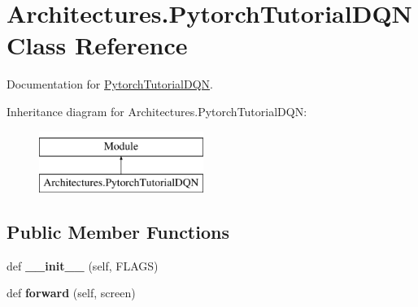 \hypertarget{classArchitectures_1_1PytorchTutorialDQN}{}\section{Architectures.\+Pytorch\+Tutorial\+D\+QN Class Reference}
\label{classArchitectures_1_1PytorchTutorialDQN}


Documentation for \mbox{\hyperlink{classArchitectures_1_1PytorchTutorialDQN}{Pytorch\+Tutorial\+D\+QN}}.  


Inheritance diagram for Architectures.\+Pytorch\+Tutorial\+D\+QN\+:\begin{figure}[H]
\begin{center}
\leavevmode
\includegraphics[height=2.000000cm]{classArchitectures_1_1PytorchTutorialDQN}
\end{center}
\end{figure}
\subsection*{Public Member Functions}
\begin{DoxyCompactItemize}
\item 
\mbox{\label{classArchitectures_1_1PytorchTutorialDQN_a8fa868705cc5d85d07c91643df260c60}} 
def {\bfseries \+\_\+\+\_\+init\+\_\+\+\_\+} (self, F\+L\+A\+GS)
\item 
\mbox{\label{classArchitectures_1_1PytorchTutorialDQN_ad35305798200b012da272b95c07b1cd8}} 
def {\bfseries forward} (self, screen)
\end{DoxyCompactItemize}
